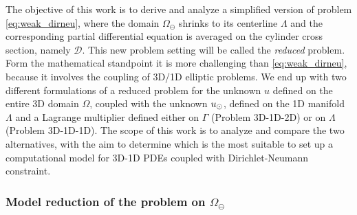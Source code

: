 \documentclass[r]{siamart171218}
\begin{document}
The objective of this work is to derive and analyze a simplified version of problem \eqref{eq:weak_dirneu}, where the domain $\Omega_\ominus$ shrinks to its centerline $\Lambda$ and the corresponding partial differential equation is averaged on the cylinder cross section, namely $\mathcal{D}$. This new problem setting will be called the \emph{reduced} problem. Form the mathematical standpoint it is more challenging than \eqref{eq:weak_dirneu}, because it involves the coupling of 3D/1D elliptic problems.
We end up with two different formulations of a reduced problem for the unknown $u$ defined on the entire 3D domain $\Omega$, 
coupled with the unknown $u_{\odot}$, defined on the 1D manifold $\Lambda$ and a Lagrange multiplier defined either on $\Gamma$ (Problem 3D-1D-2D) or on $\Lambda$ (Problem 3D-1D-1D). 
The scope of this work is to analyze and compare the two alternatives,
with the aim to determine which is the most suitable to set up a computational model for 3D-1D PDEs coupled with Dirichlet-Neumann constraint.


\subsubsection*{Model reduction of the problem on $\Omega_{\ominus}$}
\end{document}
